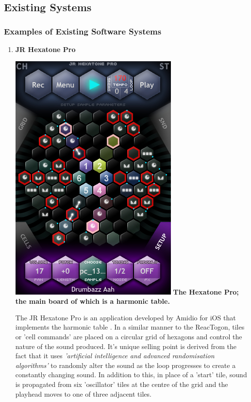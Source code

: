 \documentclass[10pt,a4paper]{article}
\begin{document}
\subsection{Existing Systems}
\subsubsection{Examples of Existing Software Systems}
\begin{enumerate}
\item \textbf{JR Hexatone Pro}
\begin{center}
\includegraphics[scale=0.35]{2.jpg}
\textbf{The Hexatone Pro;\\ the main board of which is a harmonic table.}
\end{center}
The JR Hexatone Pro is an application developed by Amidio for iOS that implements the harmonic table \cite{jrhexitunes}.  In a similar manner to the ReacTogon, tiles or 'cell commands' are placed on a circular grid of hexagons and control the nature of the sound produced. It’s unique selling point is derived from the fact that it uses \textit{'artificial intelligence and advanced randomisation algorithms'} \cite{randomalg} to randomly alter the sound as the loop progresses to create a constantly changing sound. In addition to this, in place of a 'start' tile, sound is propagated from six 'oscillator' tiles at the centre of the grid and the playhead moves to one of three adjacent tiles. \cite{amidiomanual}


\end{enumerate}
\end{document}
